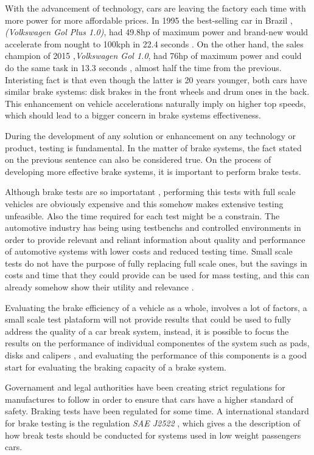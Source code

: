 	With the advancement of technology, cars are leaving the factory each time with more power for more affordable prices. In 1995 the best-selling car in Brazil \cite{lideres-vendas-brasil}, \textit{(Volkswagen Gol Plus 1.0)}, had 49.8hp of maximum power and brand-new would accelerate from nought to 100kph in 22.4 seconds \cite{cnwgol1993}. On the other hand, the sales champion of 2015 ,\textit{Volkswagen Gol 1.0}, had 76hp of maximum power and could do the same task in 13.3 seconds \cite{cnwgol2013}, almost half the time from the previous. Interisting fact is that even though the latter is 20 years younger, both cars have similar brake systems: disk brakes in the front wheels and drum ones in the back. This enhancement on vehicle accelerations naturally imply on higher top speeds, which should lead to a bigger concern in brake systems effectiveness.
	\par
	During the development of any solution or enhancement on any technology or product, testing is fundamental. In the matter of brake systems, the fact stated on the previous sentence can also be considered true. On the process of developing more effective brake systems, it is important to perform brake tests.
	\par
	Although brake tests are so importatant \cite{abendroth1985new}, performing this tests with full scale vehicles are obviously expensive and this somehow makes extensive testing unfeasible. Also the time required for each test might be a constrain. The automotive industry has being using testbenchs and controlled environments in order to provide relevant and reliant information about quality and performance of automotive systems with lower costs and reduced testing time. Small scale tests do not have the purpose of fully replacing full scale ones, but the savings in costs and time that they could provide can be used for mass testing, and this can already somehow show their utility and relevance \cite{gardinalli2005comparaccao}. 
	\par
	Evaluating the brake efficiency of a vehicle as a whole, involves a lot of factors, a small scale test plataform will not provide results that could be used to fully address the quality of a car break system, instead, it is possible to focus the results on the performance of individual componentes of the system such as pads, disks and calipers \cite{halderman2016automotive}, and evaluating the performance of this components is a good start for evaluating the braking capacity of a brake system.
	\par
	Governament and legal authorities have been creating strict regulations for manufactures to follow in order to ensure that cars have a higher standard of safety. Braking tests have been regulated for some time. A international standard for brake testing is the regulation \textit{SAE J2522} \cite{sae}, which gives a the description of how break tests should be conducted for systems used in low weight passengers cars.
